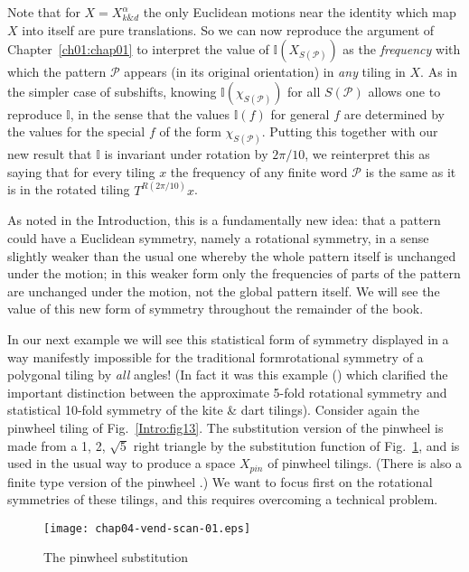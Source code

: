 \documentclass[reqno]{stml-l}
\theoremstyle{plain}
\theoremstyle{definition}
\numberwithin{equation}{chapter}
\begin{document}
Note that for $X=X_{k \& d}^{\alpha}$ the only Euclidean motions near the identity which map $X$ into itself are pure translations. So we can now reproduce the argument of Chapter~\ref{ch01:chap01} to interpret the value of $\mathbb{I}(X_{S(\mathcal{P})})$ as the \emph{frequency} with which the pattern $\mathcal{P}$ appears (in its original orientation) in \emph{any} tiling in $X$. As in the simpler case of subshifts, knowing $\mathbb{I}(\chi_{S(\mathcal{P})})$ for all $S(\mathcal{P})$ allows one to reproduce $\mathbb{I}$, in the sense that the values $\mathbb{I}(f)$ for general $f$ are determined by the values for the special $f$ of the form $\chi_{S(\mathcal{P})}$. Putting this together with our new result that $\mathbb{I}$ is invariant under rotation by $2\pi/10$, we reinterpret this as saying that for every tiling $x$ the frequency of any finite word $\mathcal{P}$ is the same as it is in the rotated tiling $T^{R(2\pi/10)}x$.

As noted in the Introduction, this is a fundamentally new idea: that a pattern could have a Euclidean symmetry, namely a rotational symmetry, in a sense slightly weaker than the usual one whereby the whole pattern itself is unchanged under the motion; in this weaker form only the frequencies of parts of the pattern are unchanged under the motion, not the global pattern itself. We will see the value of this new form of symmetry throughout the remainder of the book.

In our next example we will see this statistical form of
symmetry displayed in a way manifestly impossible for the
traditional formrotational symmetry of a polygonal tiling
by \emph{all} angles! (In fact it was this example
(\cite{bib:Ra4}) which clarified the important distinction
between the approximate 5-fold rotational symmetry and
statistical 10-fold symmetry of the kite \& dart tilings).
Consider again the pinwheel tiling of
Fig.~\ref{Intro:fig13}. The substitution version of the
pinwheel is made from a 1, 2, $\sqrt{5}$ right triangle by
the substitution function of Fig.~\ref{ch04:fig30}, and is
used in the usual way to produce a space $X_{pin}$ of
pinwheel tilings. (There is also a finite type version of
the pinwheel \cite{bib:Ra2}.) We want to focus first on the
rotational symmetries of these tilings, and this requires
overcoming a technical problem.
\begin{figure}[h]
\texttt{[image: chap04-vend-scan-01.eps]}
\caption{The pinwheel substitution}
\label{ch04:fig30}
\end{figure}
\end{document}
